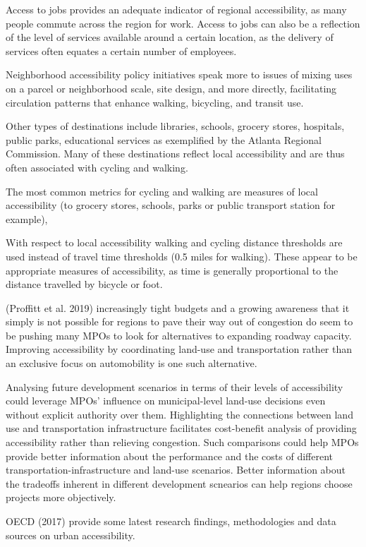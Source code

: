 \documentclass[12pt,]{article}
\begin{document}
Access to jobs provides an adequate indicator of regional accessibility,
as many people commute across the region for work. Access to jobs can
also be a reflection of the level of services available around a certain
location, as the delivery of services often equates a certain number of
employees.

Neighborhood accessibility policy initiatives speak more to issues of
mixing uses on a parcel or neighborhood scale, site design, and more
directly, facilitating circulation patterns that enhance walking,
bicycling, and transit use.

Other types of destinations include libraries, schools, grocery stores,
hospitals, public parks, educational services as exemplified by the
Atlanta Regional Commission. Many of these destinations reflect local
accessibility and are thus often associated with cycling and walking.

The most common metrics for cycling and walking are measures of local
accessibility (to grocery stores, schools, parks or public transport
station for example),

With respect to local accessibility walking and cycling distance
thresholds are used instead of travel time thresholds (0.5 miles for
walking). These appear to be appropriate measures of accessibility, as
time is generally proportional to the distance travelled by bicycle or
foot.

(Proffitt et al. 2019) increasingly tight budgets and a growing
awareness that it simply is not possible for regions to pave their way
out of congestion do seem to be pushing many MPOs to look for
alternatives to expanding roadway capacity. Improving accessibility by
coordinating land-use and transportation rather than an exclusive focus
on automobility is one such alternative.

Analysing future development scenarios in terms of their levels of
accessibility could leverage MPOs' influence on municipal-level land-use
decisions even without explicit authority over them. Highlighting the
connections between land use and transportation infrastructure
facilitates cost-benefit analysis of providing accessibility rather than
relieving congestion. Such comparisons could help MPOs provide better
information about the performance and the costs of different
transportation-infrastructure and land-use scenarios. Better information
about the tradeoffs inherent in different development scnearios can help
regions choose projects more objectively.

OECD (2017) provide some latest research findings, methodologies and
data sources on urban accessibility.
\end{document}
